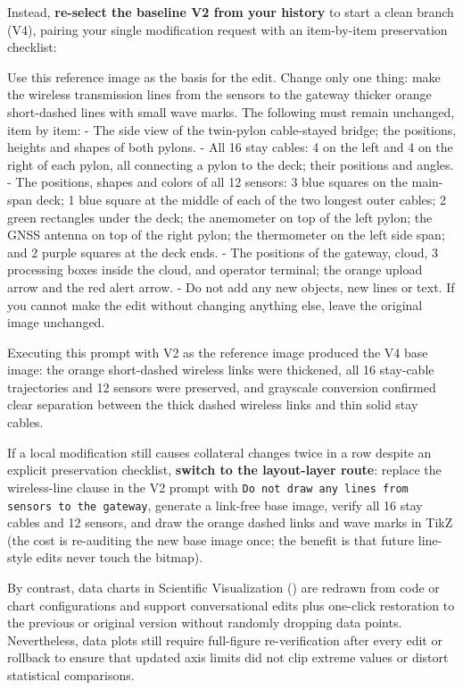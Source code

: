 Instead, \textbf{re-select the baseline V2 from your \scidraw{} history} to start a clean branch (V4), pairing your single modification request with an item-by-item preservation checklist:

\begin{Prompt}
Use this reference image as the basis for the edit. Change only one thing:
make the wireless transmission lines from the sensors to the gateway thicker
orange short-dashed lines with small wave marks.
The following must remain unchanged, item by item:
- The side view of the twin-pylon cable-stayed bridge; the positions, heights
  and shapes of both pylons.
- All 16 stay cables: 4 on the left and 4 on the right of each pylon, all
  connecting a pylon to the deck; their positions and angles.
- The positions, shapes and colors of all 12 sensors: 3 blue squares on the
  main-span deck; 1 blue square at the middle of each of the two longest
  outer cables; 2 green rectangles under the deck; the anemometer on top of
  the left pylon; the GNSS antenna on top of the right pylon; the thermometer
  on the left side span; and 2 purple squares at the deck ends.
- The positions of the gateway, cloud, 3 processing boxes inside the cloud,
  and operator terminal; the orange upload arrow and the red alert arrow.
- Do not add any new objects, new lines or text.
If you cannot make the edit without changing anything else, leave the
original image unchanged.
\end{Prompt}

Executing this prompt with V2 as the reference image produced the V4 base image: the orange short-dashed wireless links were thickened, all 16 stay-cable trajectories and 12 sensors were preserved, and grayscale conversion confirmed clear separation between the thick dashed wireless links and thin solid stay cables.

If a local modification still causes collateral changes twice in a row despite an explicit preservation checklist, \textbf{switch to the layout-layer route}: replace the wireless-line clause in the V2 prompt with \texttt{Do not draw any lines from sensors to the gateway}, generate a link-free base image, verify all 16 stay cables and 12 sensors, and draw the orange dashed links and wave marks in TikZ (the cost is re-auditing the new base image once; the benefit is that future line-style edits never touch the bitmap).

By contrast, data charts in \scidraw{} Scientific Visualization () are redrawn from code or chart configurations and support conversational edits plus one-click restoration to the previous or original version without randomly dropping data points. Nevertheless, data plots still require full-figure re-verification after every edit or rollback to ensure that updated axis limits did not clip extreme values or distort statistical comparisons.

